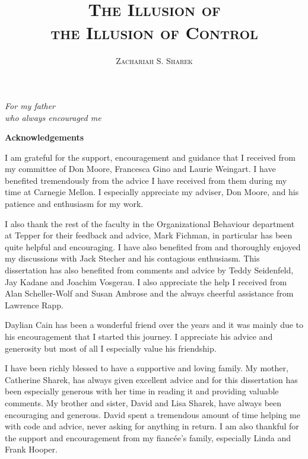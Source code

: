 \documentclass[USenglish,letterpaper,12pt,extrafontsizes,oneside,onecolumn,final]{memoir}
\title{\textsc{The Illusion of\\the Illusion of Control}}
\author{\textsc{Zachariah S. Sharek}}
\date{}
\begin{document}
\frontmatter
\maketitle
\thispagestyle{empty}
\clearpage

\begin{flushright}
\textit{For my father\\who always encouraged me}
\clearpage
\end{flushright}

\begin{center}
\Large\textbf{Acknowledgements}\\
\end{center}
I am grateful for the support, encouragement and guidance that I received from my committee of Don Moore, Francesca Gino and Laurie Weingart.  I have benefited tremendously from the advice I have received from them during my time at Carnegie Mellon.  I especially appreciate my adviser, Don Moore, and his patience and enthusiasm for my work. 

I also thank the rest of the faculty in the Organizational Behaviour department at Tepper for their feedback and advice, Mark Fichman, in particular has been quite helpful and encouraging.  I have also benefited from and thoroughly enjoyed my discussions with Jack Stecher and his contagious enthusiasm. This dissertation has also benefited from comments and advice by Teddy Seidenfeld, Jay Kadane and Joachim Vosgerau.  I also appreciate the help I received from Alan Scheller-Wolf and Susan Ambrose and the always cheerful assistance from Lawrence Rapp.   

Daylian Cain has been a wonderful friend over the years and it was mainly due to his encouragement that I started this journey.  I appreciate his advice and generosity but most of all I especially value his friendship.

I have been richly blessed to have a supportive and loving family.  My mother, Catherine Sharek, has always given excellent advice and for this dissertation has been especially generous with her time in reading it and providing valuable comments.  My brother and sister, David and Lisa Sharek, have always been encouraging and generous.  David spent a tremendous amount of time helping me with code and advice, never asking for anything in return.  I am also thankful for the support and encouragement from my fianc\'{e}e's family, especially Linda and Frank Hooper.  
\end{document}
